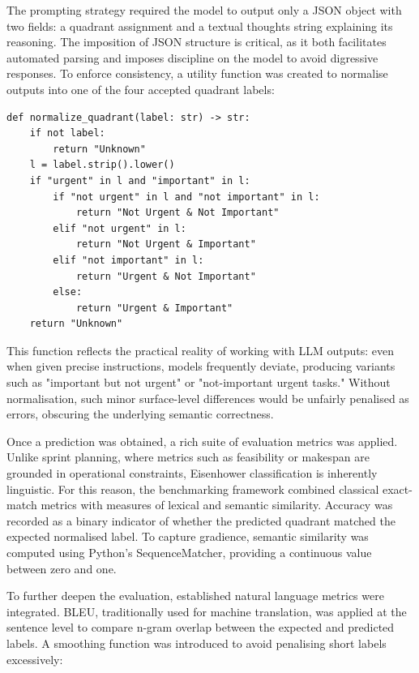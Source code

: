 \documentclass{report}
\begin{document}
The prompting strategy required the model to output only a JSON object with two fields: a quadrant assignment and a textual thoughts string explaining its reasoning. 
The imposition of JSON structure is critical, as it both facilitates automated parsing and imposes discipline on the model to avoid digressive responses. 
To enforce consistency, a utility function was created to normalise outputs into one of the four accepted quadrant labels:

\begin{lstlisting}[style=pythonstyle]
def normalize_quadrant(label: str) -> str:
    if not label:
        return "Unknown"
    l = label.strip().lower()
    if "urgent" in l and "important" in l:
        if "not urgent" in l and "not important" in l:
            return "Not Urgent & Not Important"
        elif "not urgent" in l:
            return "Not Urgent & Important"
        elif "not important" in l:
            return "Urgent & Not Important"
        else:
            return "Urgent & Important"
    return "Unknown"

\end{lstlisting}

This function reflects the practical reality of working with LLM outputs: even when given precise instructions, models frequently deviate, producing variants such as "important but not urgent" or "not-important urgent tasks." 
Without normalisation, such minor surface-level differences would be unfairly penalised as errors, obscuring the underlying semantic correctness.

Once a prediction was obtained, a rich suite of evaluation metrics was applied. 
Unlike sprint planning, where metrics such as feasibility or makespan are grounded in operational constraints, Eisenhower classification is inherently linguistic. 
For this reason, the benchmarking framework combined classical exact-match metrics with measures of lexical and semantic similarity. 
Accuracy was recorded as a binary indicator of whether the predicted quadrant matched the expected normalised label. 
To capture gradience, semantic similarity was computed using Python's SequenceMatcher, providing a continuous value between zero and one.

To further deepen the evaluation, established natural language metrics were integrated. 
BLEU, traditionally used for machine translation, was applied at the sentence level to compare n-gram overlap between the expected and predicted labels. 
A smoothing function was introduced to avoid penalising short labels excessively:
\end{document}
